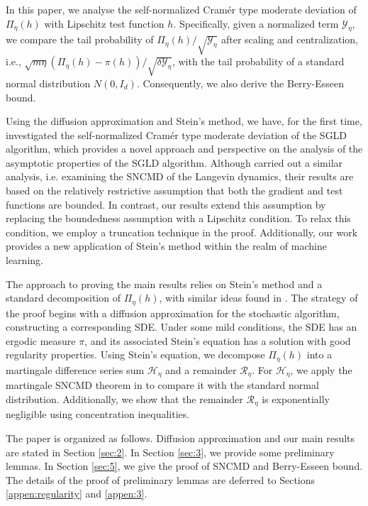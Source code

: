 \documentclass[12pt]{amsart}
\theoremstyle{definition}
\theoremstyle{remark}
\numberwithin{equation}{section}
\begin{document}
 In this paper, we analyse the self-normalized Cram\'er type moderate deviation of $\Pi_\eta(h)$ with Lipschitz test function $h$. Specifically, given a normalized term $\mathcal{Y}_\eta$, we compare the tail probability of $\Pi_\eta(h)/\sqrt{\mathcal{Y}_\eta}$
 after scaling and centralization, i.e., $\sqrt{m\eta}(\Pi_\eta(h)-\pi(h))/\sqrt{\delta\mathcal{Y}_\eta}$,
 with the tail probability of a standard normal distribution $N(0,I_d)$. Consequently, we also derive the Berry-Esseen bound. 
 
Using the diffusion approximation and Stein's method, we have, for the first time, investigated the self-normalized Cram\'er type moderate deviation of the SGLD algorithm, which provides a novel approach and perspective on the analysis of the asymptotic properties of the SGLD algorithm. Although \cite{Lu2022central, fan2024normalized} carried out a similar analysis, i.e. examining the SNCMD of the Langevin dynamics, their results are based on the relatively restrictive assumption that both the gradient and test functions are bounded.
In contrast, our results extend this assumption by replacing the boundedness assumption with a Lipschitz condition. To relax this condition, we employ a truncation technique in the proof. Additionally, our work provides a new application of Stein’s method within the realm of machine learning.



The approach to proving the main results relies on Stein’s method and a standard decomposition of $\Pi_\eta(h)$, with similar ideas found in \cite{Lu2022central, Teh2016}. The strategy of the proof begins with a diffusion approximation for the stochastic algorithm, constructing a corresponding SDE. Under some mild conditions, the SDE has an ergodic measure $\pi$, and its associated Stein's equation has a solution with good regularity properties. Using Stein's equation, we decompose $\Pi_\eta(h)$ into a martingale difference series sum $\mathcal{H}_\eta$ and a remainder $\mathcal{R}_\eta$. For $\mathcal{H}_\eta$, we apply the martingale SNCMD theorem in \cite{fan2024normalized} to compare it with the standard normal distribution. Additionally, we show that the remainder $\mathcal R_\eta$ is exponentially negligible using concentration inequalities. 




The paper is organized as follows. Diffusion approximation and our main results are stated in Section \ref{sec:2}. In Section \ref{sec:3}, we provide some preliminary lemmas. %
In Section \ref{sec:5}, we give the proof of SNCMD and Berry-Esseen bound. The details of the proof of preliminary lemmas are deferred to Sections \ref{appen:regularity} and \ref{appen:3}. %
\end{document}
